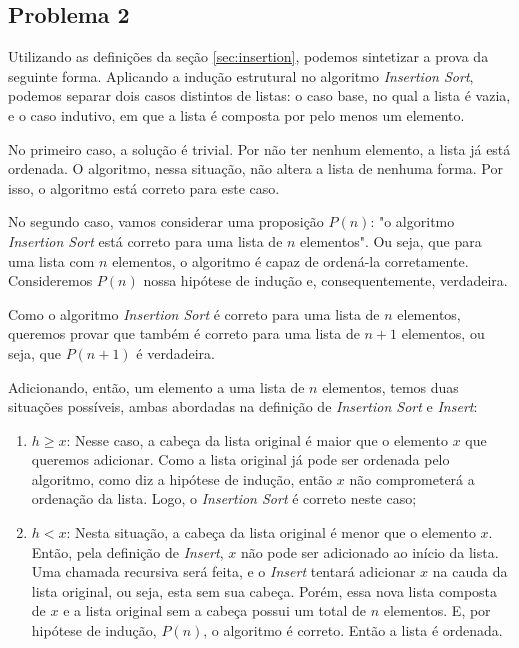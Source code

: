 \documentclass[a4paper, 10pt]{article}
\begin{document}
\subsection{Problema 2}

Utilizando as definições da seção \ref{sec:insertion}, podemos sintetizar a prova da seguinte forma.
Aplicando a indução estrutural no algoritmo \textit{Insertion Sort}, podemos separar dois casos distintos de listas: o caso base, no qual a lista é vazia, e o caso indutivo, em que a lista é composta por pelo menos um elemento.

No primeiro caso, a solução é trivial. Por não ter nenhum elemento, a lista já está ordenada. O algoritmo, nessa situação, não altera a lista de nenhuma forma. Por isso, o algoritmo está correto para este caso.

No segundo caso, vamos considerar uma proposição $P(n)$: "o algoritmo \textit{Insertion Sort} está correto para uma lista de $n$ elementos". Ou seja, que para uma lista com $n$ elementos, o algoritmo é capaz de ordená-la corretamente. Consideremos $P(n)$ nossa hipótese de indução e, consequentemente, verdadeira.

Como o algoritmo \textit{Insertion Sort} é correto para uma lista de $n$ elementos, queremos provar que também é correto para uma lista de $n+1$ elementos, ou seja, que $P(n+1)$ é verdadeira.

Adicionando, então, um elemento a uma lista de $n$ elementos, temos duas situações possíveis, ambas abordadas na definição de \textit{Insertion Sort} e \textit{Insert}:
\begin{enumerate}
	\item $h \geq x$: Nesse caso, a cabeça da lista original é maior que o elemento $x$ que queremos adicionar. Como a lista original já pode ser ordenada pelo algoritmo, como diz a hipótese de indução, então $x$ não comprometerá a ordenação da lista. Logo, o \textit{Insertion Sort} é correto neste caso;
    \item $h < x$: Nesta situação, a cabeça da lista original é menor que o elemento $x$. Então, pela definição de \textit{Insert}, $x$ não pode ser adicionado ao início da lista. Uma chamada recursiva será feita, e o \textit{Insert} tentará adicionar $x$ na cauda da lista original, ou seja, esta sem sua cabeça. Porém, essa nova lista composta de $x$ e a lista original sem a cabeça possui um total de $n$ elementos. E, por hipótese de indução, $P(n)$, o algoritmo é correto. Então a lista é ordenada.
\end{enumerate}
\end{document}

